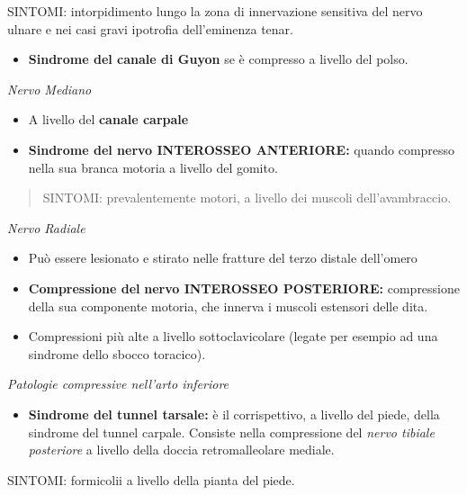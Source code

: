 \documentclass[]{article}
\begin{document}
SINTOMI: intorpidimento lungo la zona di innervazione sensitiva del
nervo ulnare e nei casi gravi ipotrofia dell'eminenza tenar.

\begin{itemize}
\item
  \textbf{Sindrome del canale di Guyon} se è compresso a livello del
  polso.
\end{itemize}

\emph{Nervo Mediano}

\begin{itemize}
\item
  A livello del \textbf{canale carpale}
\item
  \textbf{Sindrome del nervo INTEROSSEO ANTERIORE:} quando compresso
  nella sua branca motoria a livello del gomito.
\end{itemize}

\begin{quote}
SINTOMI: prevalentemente motori, a livello dei muscoli dell'avambraccio.
\end{quote}

\emph{Nervo Radiale}

\begin{itemize}
\item
  Può essere lesionato e stirato nelle fratture del terzo distale
  dell'omero
\item
  \textbf{Compressione del} \textbf{nervo INTEROSSEO POSTERIORE:}
  compressione della sua componente motoria, che innerva i muscoli
  estensori delle dita.
\item
  Compressioni più alte a livello sottoclavicolare (legate per esempio
  ad una sindrome dello sbocco toracico).
\end{itemize}

\emph{Patologie compressive nell'arto inferiore}

\begin{itemize}
\item
  \textbf{Sindrome del tunnel tarsale:} è il corrispettivo, a livello
  del piede, della sindrome del tunnel carpale. Consiste nella
  compressione del \emph{nervo tibiale posteriore} a livello della
  doccia retromalleolare mediale.
\end{itemize}

SINTOMI: formicolii a livello della pianta del piede.
\end{document}
